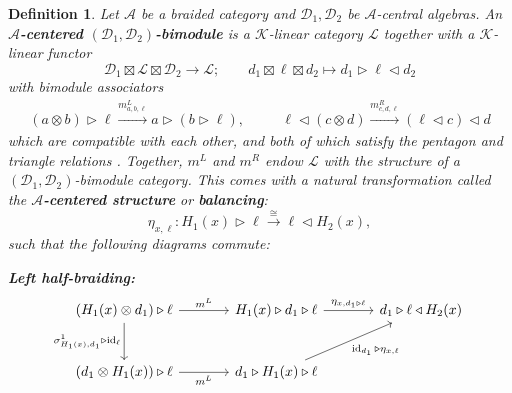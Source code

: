 \documentclass[a4paper]{article}
\numberwithin{equation}{section}
\newtheorem{definition}[counter]{Definition}
\newcommand{\1}{{\mathrm{1}\mkern-4mu{\mathchoice{}{}{\mskip-0.5mu}{\mskip-1mu}}\mathrm{l}}}
\newcommand{\A}{\mathcal{A}}
\newcommand{\D}{\mathcal{D}}
\newcommand{\K}{\mathcal{K}}
\renewcommand{\L}{\mathcal{L}}
\DeclareMathOperator{\id}{id}
\begin{document}
\begin{definition}\label{def:centered-bimodule}
    Let $\A$ be a braided category and $\D_1,\D_2$ be $\A$-central algebras. An \emph{\bf $\A$-centered $(\D_1,\D_2)$-bimodule} is a $\K$-linear category $\L$ together with a $\K$-linear functor 
    \begin{equation}
       \D_1 \boxtimes \L \boxtimes \D_2 \to \L;\qquad d_1\boxtimes\ell\boxtimes d_2 \mapsto d_1\triangleright\ell\triangleleft d_2
    \end{equation}
    with bimodule associators
    \begin{equation}
      \begin{aligned}
        (a\otimes b) \triangleright \ell \xrightarrow{m^L_{a,b,\ell}} a\triangleright (b\triangleright \ell), &\quad& \ell \triangleleft (c\otimes d) \xrightarrow{m^R_{c,d,\ell}} (\ell \triangleleft c) \triangleleft d
      \end{aligned}
    \end{equation}
    which are compatible with each other, and both of which satisfy the pentagon  and triangle relations \cite{EGNO}. Together, $m^L$ and $m^R$ endow $\L$ with the structure of a $(\D_1,\D_2)$-bimodule category.
    This comes with a natural transformation called the \emph{\bf $\A$-centered structure} or \emph{\bf balancing}:
    \begin{equation}\label{eq:balancing}
        \eta_{x,\ell} : H_1(x)\triangleright \ell \overset{\cong}{\longrightarrow} \ell\triangleleft H_2(x),
    \end{equation}
    such that the following diagrams commute:
    \medskip

    \noindent\textbf{Left half-braiding:}
    \begin{equation}\label{eq:left-half-braiding}
        \begin{tikzcd}[row sep=large, column sep=large]
            (H_1(x) \otimes d_1) \triangleright \ell \arrow[r, "m^L"] \arrow[d, "\sigma^1_{H_1(x),d_1} \triangleright \id_\ell"'] 
            & H_1(x) \triangleright d_1 \triangleright \ell \arrow[r, "\eta_{x,d_1\triangleright\ell}"] 
            & d_1 \triangleright \ell \triangleleft H_2(x) \\
            (d_1 \otimes H_1(x)) \triangleright \ell \arrow[r, "m^L"'] 
            & d_1 \triangleright H_1(x) \triangleright \ell \arrow[ur, "\id_{d_1} \triangleright \eta_{x,\ell}"'] 
            &
        \end{tikzcd}
    \end{equation}


\end{definition}
\end{document}
